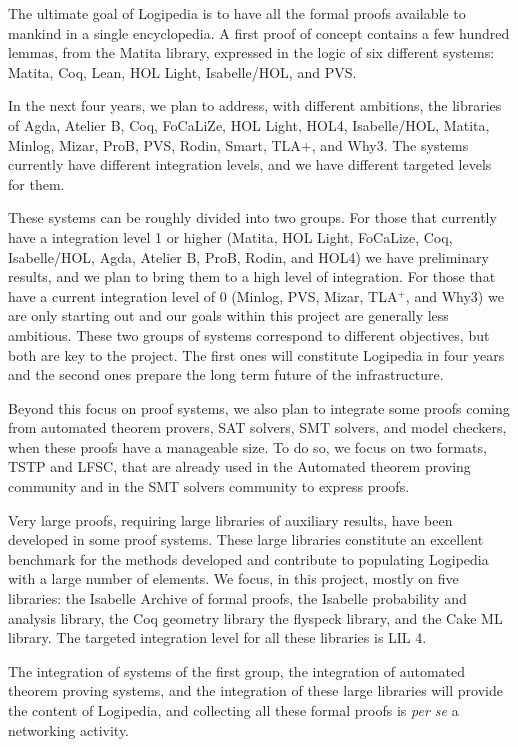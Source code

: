 The ultimate goal of Logipedia is to have all the formal proofs
available to mankind in a single encyclopedia.  A first proof of
concept contains a few hundred lemmas, from the Matita library,
expressed in the logic of six different systems: Matita, Coq, Lean,
HOL Light, Isabelle/HOL, and PVS.

In the next four years, we plan to address, with different ambitions,
the libraries of Agda, Atelier B, Coq, FoCaLiZe, HOL Light, HOL4,
Isabelle/HOL, Matita, Minlog, Mizar, ProB, PVS, Rodin, Smart, TLA+,
and Why3.  The systems currently have different integration levels,
and we have different targeted levels for them.

These systems can be roughly divided into two groups.  For those that
currently have a integration level 1 or higher (Matita, HOL Light,
FoCaLize, Coq, Isabelle/HOL, Agda, Atelier B, ProB, Rodin, and HOL4)
we have preliminary results, and we plan to bring them to a high level
of integration.  For those that have a current integration level of 0
(Minlog, PVS, Mizar, TLA$^+$, and Why3) we are only starting out and
our goals within this project are generally less ambitious.  These two
groups of systems correspond to different objectives, but both are key
to the project. The first ones will constitute Logipedia in four years
and the second ones prepare the long term future of the
infrastructure.

Beyond this focus on proof systems, we also plan to integrate some
proofs coming from automated theorem provers, SAT solvers, SMT
solvers, and model checkers, when these proofs have a manageable
size. To do so, we focus on two formats, TSTP and LFSC, that are
already used in the Automated theorem proving community and in the SMT
solvers community to express proofs.

Very large proofs, requiring large libraries of auxiliary results,
have been developed in some proof systems. These large libraries 
constitute an excellent benchmark for the methods developed and
contribute to populating Logipedia with a large number of elements.
We focus, in this project, mostly on five libraries: 
the Isabelle Archive of formal proofs,
the Isabelle probability and analysis library, 
the Coq geometry library
the flyspeck library, and the 
Cake ML	library.
The targeted integration level for all these libraries is LIL 4.

The integration of systems of the first group, the integration of
automated theorem proving systems, and the integration of these large
libraries will provide the content of Logipedia, and collecting all
these formal proofs is {\em per se} a networking activity.

